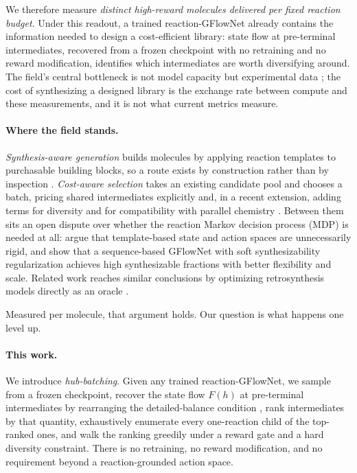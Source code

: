 \documentclass{article}
\begin{document}
We therefore measure \emph{distinct high-reward molecules delivered per fixed reaction budget}. Under this readout, a trained reaction-GFlowNet already contains the information needed to design a cost-efficient library: state flow at pre-terminal intermediates, recovered from a frozen checkpoint with no retraining and no reward modification, identifies which
intermediates are worth diversifying around. The field's central bottleneck is not model capacity but experimental data \citep{abolhasani2023sdl,tom2024sdl}; the cost of synthesizing a designed library is the exchange rate between compute and these measurements, and it is not what current metrics measure.

\paragraph{Where the field stands.}
\emph{Synthesis-aware generation} builds molecules by applying reaction templates to
purchasable building blocks, so a route exists by construction rather than by inspection \citep{koziarski2024rgfn,cretu2025synflownet,seo2024rxnflow,gainski2026scent,gao2025synformer}. \emph{Cost-aware selection} takes an existing candidate pool and chooses a batch, pricing shared intermediates explicitly \citep{fromer2024sparrow} and, in a recent extension,
adding terms for diversity and for compatibility with parallel chemistry
\citep{fromer2025diversity}. Between them sits an open dispute over whether the reaction Markov decision process (MDP) is needed at all: \citet{kim2026s3gfn} argue that template-based state and action spaces are unnecessarily rigid, and show that a sequence-based GFlowNet with soft synthesizability regularization achieves high synthesizable fractions with better flexibility and scale. Related work reaches similar conclusions by optimizing retrosynthesis models directly as an oracle \citep{guo2024saturn,guo2026tango}.

Measured per molecule, that argument holds. Our question is what happens one level up.

\paragraph{This work.}
We introduce \emph{hub-batching}. Given any trained reaction-GFlowNet, we sample from a
frozen checkpoint, recover the state flow $F(h)$ at pre-terminal intermediates by
rearranging the detailed-balance condition
\citep{bengio2023gflownetfoundations,malkin2022trajectorybalance}, rank intermediates by that quantity, exhaustively enumerate every one-reaction child of the top-ranked ones, and walk the ranking greedily under a reward gate and a hard diversity constraint. There is no retraining, no reward modification, and no requirement beyond a reaction-grounded action space.
\end{document}
